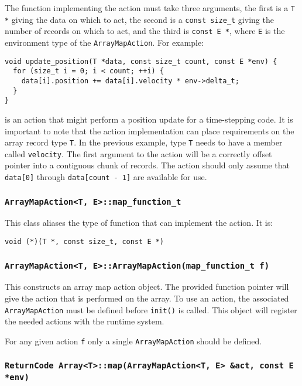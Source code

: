 The function implementing the action must take three arguments, the first is
a \texttt{T *} giving the data on which to act, the second is a
\texttt{const size\_t} giving the number of records on which to act, and the
third is \texttt{const E *}, where \texttt{E} is the environment type of the
\texttt{ArrayMapAction}. For example:

\begin{verbatim}
void update_position(T *data, const size_t count, const E *env) {
  for (size_t i = 0; i < count; ++i) {
    data[i].position += data[i].velocity * env->delta_t;
  }
}
\end{verbatim}

\noindent is an action that might perform a position update for a
time-stepping code. It is important to note that the action implementation can
place requirements on the array record type \texttt{T}. In the previous
example, type \texttt{T} needs to have a member called \texttt{velocity}.
The first argument to the action will be a correctly offset pointer into a
contiguous chunk of records. The action should only assume that
\texttt{data[0]} through \texttt{data[count - 1]} are available for use.

\subsubsection{\texttt{ArrayMapAction<T, E>::map\_function\_t}}

This class aliases the type of function that can implement the action. It is:

\begin{verbatim}
void (*)(T *, const size_t, const E *)
\end{verbatim}

\subsubsection{\texttt{ArrayMapAction<T, E>::ArrayMapAction(map\_function\_t f)}}

This constructs an array map action object. The provided function pointer
will give the action that is performed on the array. To use an action,
the associated \texttt{ArrayMapAction} must be defined before \texttt{init()} is
called. This object will register the needed actions with the runtime system.

For any given action \texttt{f} only a single \texttt{ArrayMapAction}
should be defined.

\subsubsection{\texttt{ReturnCode Array<T>::map(ArrayMapAction<T, E> \&act, const E *env)}}

